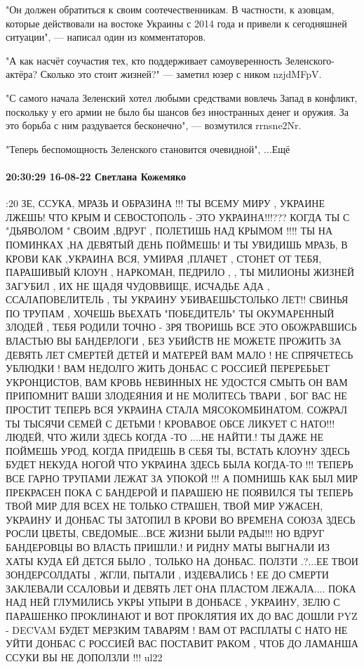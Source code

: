"Он должен обратиться к своим соотечественникам. В частности, к азовцам,
которые действовали на востоке Украины с 2014 года и привели к сегодняшней
ситуации", — написал один из комментаторов.

"А как насчёт соучастия тех, кто поддерживает самоуверенность
Зеленского-актёра? Сколько это стоит жизней?" — заметил юзер с ником nzjdMFpV.

"С самого начала Зеленский хотел любыми средствами вовлечь Запад в конфликт,
поскольку у его армии не было бы шансов без иностранных денег и оружия. За это
борьба с ним раздувается бесконечно", — возмутился rrnsne2Nr.

"Теперь беспомощность Зеленского становится очевидной", ...Ещё

\paragraph{20:30:29 16-08-22 Светлана Кожемяко}

:20
ЗЕ, ССУКА, МРАЗЬ И ОБРАЗИНА !!!
ТЫ ВСЕМУ МИРУ , УКРАИНЕ ЛЖЕШЬ!
ЧТО КРЫМ И СЕВОСТОПОЛЬ
- ЭТО УКРАИНА!!!???
КОГДА ТЫ С "ДЬЯВОЛОМ "
СВОИМ ,ВДРУГ ,
ПОЛЕТИШЬ НАД КРЫМОМ !!!!
ТЫ НА ПОМИНКАХ ,НА ДЕВЯТЫЙ ДЕНЬ ПОЙМЕШЬ!
И ТЫ УВИДИШЬ МРАЗЬ,
В КРОВИ КАК ,УКРАИНА
ВСЯ, УМИРАЯ ,ПЛАЧЕТ ,
СТОНЕТ ОТ ТЕБЯ,
ПАРАШИВЫЙ КЛОУН ,
НАРКОМАН, ПЕДРИЛО , ,
ТЫ МИЛИОНЫ ЖИЗНЕЙ
ЗАГУБИЛ , ИХ НЕ ЩАДЯ
ЧУДОВВИЩЕ, ИСЧАДЬЕ АДА , ССАЛАПОВЕЛИТЕЛЬ ,
ТЫ УКРАИНУ УБИВАЕШЬСТОЛЬКО ЛЕТ!! СВИНЬЯ
ПО ТРУПАМ , ХОЧЕШЬ ВЬЕХАТЬ
"ПОБЕДИТЕЛЬ"
ТЫ ОКУМАРЕННЫЙ ЗЛОДЕЙ ,
ТЕБЯ РОДИЛИ ТОЧНО - ЗРЯ
ТВОРИШЬ ВСЕ ЭТО
ОБОЖРАВШИСЬ ВЛАСТЬЮ
ВЫ БАНДЕРЛОГИ ,
БЕЗ УБИЙСТВ НЕ МОЖЕТЕ ПРОЖИТЬ
ЗА ДЕВЯТЬ ЛЕТ СМЕРТЕЙ
ДЕТЕЙ И МАТЕРЕЙ ВАМ МАЛО !
НЕ СПРЯЧЕТЕСЬ УБЛЮДКИ !
ВАМ НЕДОЛГО ЖИТЬ
ДОНБАС С РОССИЕЙ
ПЕРЕРЕБЬЕТ УКРОНЦИСТОВ,
ВАМ КРОВЬ НЕВИННЫХ
НЕ УДОСТСЯ СМЫТЬ
ОН ВАМ ПРИПОМНИТ
ВАШИ ЗЛОДЕЯНИЯ
И НЕ МОЛИТЕСЬ ТВАРИ ,
БОГ ВАС НЕ ПРОСТИТ
ТЕПЕРЬ ВСЯ УКРАИНА
СТАЛА МЯСОКОМБИНАТОМ.
СОЖРАЛ ТЫ ТЫСЯЧИ СЕМЕЙ
С ДЕТЬМИ !
КРОВАВОЕ ОБСЕ
ЛИКУЕТ С НАТО!!!
ЛЮДЕЙ, ЧТО ЖИЛИ ЗДЕСЬ
КОГДА -ТО ....НЕ НАЙТИ.!
ТЫ ДАЖЕ НЕ ПОЙМЕШЬ УРОД,
КОГДА ПРИДЕШЬ В СЕБЯ ТЫ,
ВСТАТЬ КЛОУНУ ЗДЕСЬ
БУДЕТ НЕКУДА НОГОЙ
ЧТО УКРАИНА ЗДЕСЬ
БЫЛА КОГДА-ТО !!!
ТЕПЕРЬ ВСЕ ГАРНО ТРУПАМИ
ЛЕЖАТ ЗА УПОКОЙ !!!
А ПОМНИШЬ КАК
БЫЛ МИР ПРЕКРАСЕН
ПОКА С БАНДЕРОЙ
И ПАРАШЕЮ НЕ ПОЯВИЛСЯ ТЫ
ТЕПЕРЬ ТВОЙ МИР
ДЛЯ ВСЕХ НЕ ТОЛЬКО СТРАШЕН,
ТВОЙ МИР УЖАСЕН,
УКРАИНУ И ДОНБАС ТЫ ЗАТОПИЛ В КРОВИ
ВО ВРЕМЕНА СОЮЗА
ЗДЕСЬ РОСЛИ ЦВЕТЫ,
СВЕДОМЫЕ...ВСЕ ЖИЗНИ
БЫЛИ РАДЫ!!!
НО ВДРУГ БАНДЕРОВЦЫ
ВО ВЛАСТЬ ПРИШЛИ.!
И РИДНУ МАТЫ
ВЫГНАЛИ ИЗ ХАТЫ
КУДА ЕЙ ДЕТСЯ БЫЛО ,
ТОЛЬКО НА ДОНБАС.
ПОЛЗТИ .?...ЕЕ ТВОИ
ЗОНДЕРСОЛДАТЫ , ЖГЛИ,
ПЫТАЛИ , ИЗДЕВАЛИСЬ !
ЕЕ ДО СМЕРТИ
ЗАКЛЕВАЛИ ССАЛОВЬИ
И ДЕВЯТЬ ЛЕТ
ОНА ПЛАСТОМ ЛЕЖАЛА....
ПОКА НАД НЕЙ ГЛУМИЛИСЬ
УКРЫ УПЫРИ
В ДОНБАСЕ , УКРАИНУ, ЗЕЛЮ С ПАРАШЕНКО ПРОКЛИНАЮТ
И ВОТ ПРОКЛЯТИЯ
ИХ ДО ВАС ДОШЛИ
PYZ - DECVAM БУДЕТ
МЕРЗКИМ ТАВАРЯМ !
ВАМ ОТ РАСПЛАТЫ
С НАТО НЕ УЙТИ
ДОНБАС С РОССИЕЙ
ВАС ПОСТАВИТ РАКОМ ,
ЧТОБ ДО ЛАМАНША
ССУКИ ВЫ НЕ ДОПОЛЗЛИ !!!
ul22
\restorecr

